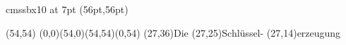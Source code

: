 

\font\myfont cmssbx10 at 7pt
\PapierGroesse(56pt,56pt)




\begin{psfigur}(54,54)
\psPolygon[fuellfarbe=0.753,eckradius=5,linienstil=](0,0)(54,0)(54,54)(0,54)
\psNeueSchicht
\rpin(27,36){\myfont Die}
\rpin(27,25){\myfont Schl\"ussel-}
\rpin(27,14){\myfont erzeugung}
\end{psfigur}
 
